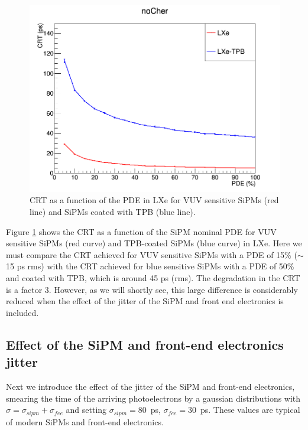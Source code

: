 \documentclass[review]{elsarticle}
\begin{document}
{\begin{figure}[!bhtp]
	\centering
	\includegraphics[scale=3]{../img/CRTvsPDELXeTPBNoJitter.png}
	\caption{\label{fig.crt2} CRT as a function of the PDE in LXe for VUV sensitive SiPMs (red line) and SiPMs coated with TPB (blue line). }
\end{figure}

Figure \ref{fig.crt2} shows the CRT as a function of the
 SiPM nominal PDE for VUV sensitive SiPMs (red curve) and TPB-coated SiPMs (blue curve) in LXe. Here we must compare the CRT achieved for VUV sensitive SiPMs with a PDE of 15\% ($\sim$ 15 ps rms) with the CRT achieved for blue sensitive SiPMs with a PDE of 50\% and coated with TPB, which is around 45 ps (rms). The degradation in the CRT is a factor 3. However, as we will shortly see, this large difference is
 considerably reduced when the effect of the jitter of the SiPM and front end electronics is included. 
  
\subsection*{Effect of the SiPM  and front-end electronics jitter}
  Next we introduce the effect of the jitter of the SiPM and front-end electronics, smearing the time of the arriving photoelectrons by a gaussian distributions with $\sigma = \sigma_{sipm} +  \sigma_{fee}$ and setting 
 $\sigma_{sipm} = 80$~ps, $\sigma_{fee} = 30$~ps. These values are typical of modern SiPMs and front-end electronics. 
 
}
\end{document}
